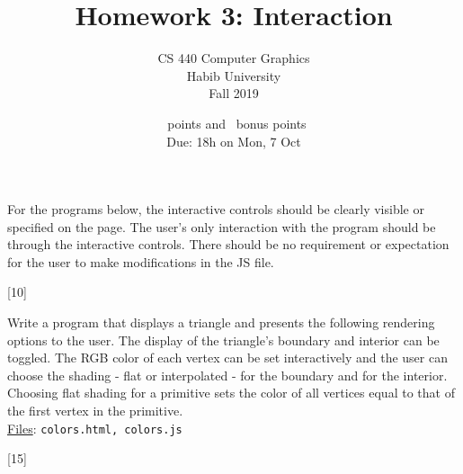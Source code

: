 \documentclass[addpoints]{exam}
\title{Homework 3: Interaction}
\author{CS 440 Computer Graphics\\Habib University\\Fall 2019}
\date{\numpoints\ points and \numbonuspoints\ bonus points\\Due: 18h on Mon, 7 Oct}
\begin{document}
\maketitle

For the programs below, the interactive controls should be clearly visible or specified on the page. The user's only interaction with the program should be through the interactive controls. There should be no requirement or expectation for the user to make modifications in the JS file.

\begin{questions}

  [10]

  Write a program that displays a triangle and presents the following rendering options to the user. The display of the triangle's boundary and interior can be toggled. The RGB color of each vertex can be set interactively and the user can choose the shading - flat or interpolated - for the boundary and for the interior. Choosing flat shading for a primitive sets the color of all vertices equal to that of the first vertex in the primitive.
  \\\noindent\underline{Files}: {\tt colors.html, colors.js}

  [15]


\end{questions}
\end{document}
